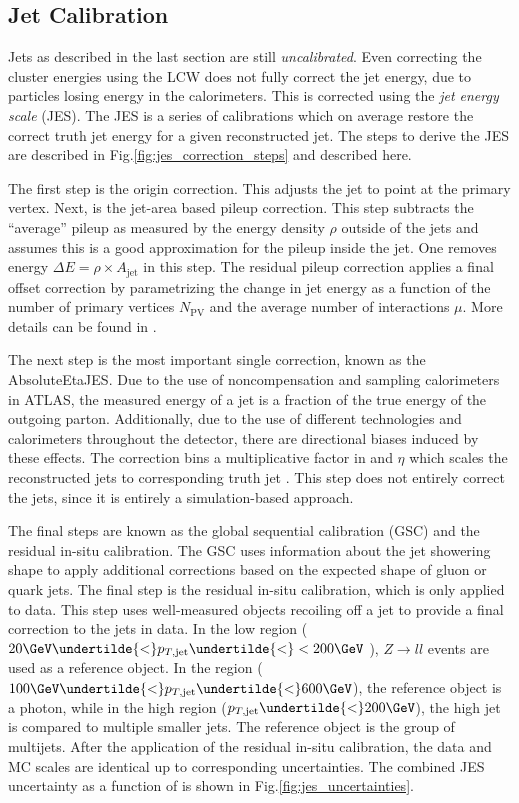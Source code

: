 \subsection{Jet Calibration}

Jets as described in the last section are still \textit{uncalibrated}.
Even correcting the cluster energies using the LCW does not fully correct the jet energy, due to particles losing energy in the calorimeters.
This is corrected using the \textit{jet energy scale} (JES).
The JES is a series of calibrations which on average restore the correct truth jet energy for a given reconstructed jet.
The steps to derive the JES are described in Fig.\ref{fig:jes_correction_steps} and described here.

The first step is the origin correction.
This adjusts the jet to point at the primary vertex.
Next, is the jet-area based pileup correction.
This step subtracts the ``average'' pileup as measured by the energy density $\rho$ outside of the jets and assumes this is a good approximation for the pileup inside the jet.
One removes energy $\Delta E = \rho \times A_{\text{jet}}$ in this step.
The residual pileup correction applies a final offset correction by parametrizing the change in jet energy as a function of the number of primary vertices $N_{\text{PV}}$ and the average number of interactions $\mu$.
More details can be found in \cite{PERF-2012-01}.

The next step is the most important single correction, known as the AbsoluteEtaJES.
Due to the use of noncompensation and sampling calorimeters in ATLAS, the measured energy of a jet is a fraction of the true energy of the outgoing parton.
Additionally, due to the use of different technologies and calorimeters throughout the detector, there are directional biases induced by these effects.
The correction bins a multiplicative factor in \pt and $\eta$ which scales the reconstructed jets to corresponding truth jet \pt.
This step does not entirely correct the jets, since it is entirely a simulation-based approach.

The final steps are known as the global sequential calibration (GSC) and the residual in-situ calibration.
The GSC uses information about the jet showering shape to apply additional corrections based on the expected shape of gluon or quark jets.
The final step is the residual in-situ calibration, which is only applied to data.
This step uses well-measured objects recoiling off a jet to provide a final correction to the jets in data.
In the low \pt region ($20 \GeV \undertilde{<} p_{T,\text{jet}} \undertilde{<} < 200 \GeV $ ), $Z \rightarrow ll$ events are used as a reference object.
In the \pt region ($100 \GeV \undertilde{<} p_{T,\text{jet}} \undertilde{<} 600 \GeV $), the reference object is a photon, while in the high \pt region ($p_{T,\text{jet}} \undertilde{<} 200 \GeV $), the high \pt jet is compared to multiple smaller \pt jets.
The reference object is the group of multijets.
After the application of the residual in-situ calibration, the data and MC scales are identical up to corresponding uncertainties.
The combined JES uncertainty as a function of \pt is shown in Fig.\ref{fig:jes_uncertainties}.

